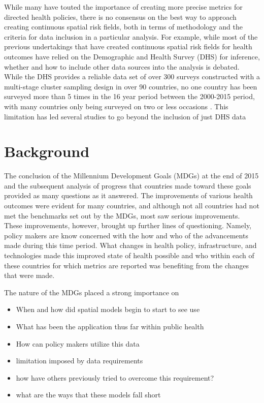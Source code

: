 \documentclass{article}
\begin{document}
While many have touted the importance of creating more precise metrics for directed health policies\cite{Bhutta2016, Desmond-Hellmann2016}, there is no consensus on the best way to approach creating continuous spatial risk fields, both in terms of methodology and the criteria for data inclusion in a particular analysis. For example, while most of the previous undertakings that have created continuous spatial risk fields for health outcomes have relied on the Demographic and Health Survey (DHS) for inference, whether and how to include other data sources into the analysis is debated. While the DHS provides a reliable data set of over 300 surveys constructed with a multi-stage cluster sampling design in over 90 countries, no one country has been surveyed more than 5 times in the 16 year period between the 2000-2015 period, with many countries only being surveyed on two or less occasions \cite{Burgert-Brucker2016, Gething2015}. This limitation has led several studies to go beyond the inclusion of just DHS data 

\section{Background}\label{background}

The conclusion of the Millennium Development Goals (MDGs) at the end of 2015 and the subsequent analysis of progress that countries made toward these goals provided as many questions as it answered. The improvements of various health outcomes were evident for many countries, and although not all countries had not met the benchmarks set out by the MDGs, most saw serious improvements. These improvements, however, brought up further lines of questioning. Namely, policy makers are know concerned with the how and who of the advancements made during this time period. What changes in health policy, infrastructure, and technologies made this improved state of health possible and who within each of these countries for which metrics are reported was benefiting from the changes that were made. 

The nature of the MDGs placed a strong importance on 

\begin{itemize}
\item When and how did spatial models begin to start to see use 
\item What has been the application thus far within public health
\item How can policy makers utilize this data
\item limitation imposed by data requirements
\item how have others previously tried to overcome this requirement?
\item what are the ways that these models fall short
\end{itemize}
\end{document}
